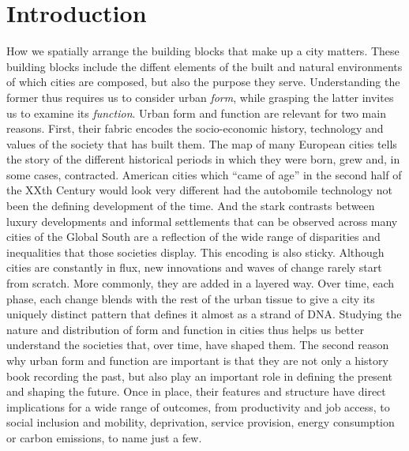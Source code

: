 \section{Introduction}
\label{sec:intro}

How we spatially arrange the building blocks that make up a city matters.
These building blocks include the diffent
elements of the built and natural environments of which cities are composed,
but also the purpose they serve.
Understanding the former thus requires us to consider urban \textit{form}, while
grasping the latter invites us to examine its \textit{function}.
Urban form and function are relevant for two main reasons. First, their fabric
encodes the socio-economic history, technology and values
of the society that has built them. 
%
The map of many European cities tells the story of the different historical
periods in which they were born, grew and, in some cases, contracted.
%
American cities which ``came of age'' in the second half of the XXth Century
would look very different had the autobomile technology not been the defining
development of the time.
%
And the stark contrasts between luxury developments and informal settlements
that can be observed across many cities of the Global South are a reflection
of the wide range of disparities and inequalities that those societies
display.
%
This encoding is also sticky. Although cities are constantly in flux, new
innovations and waves of change rarely start from scratch. More commonly, they
are added in a layered way. Over time, each phase, each change blends with the rest
of the urban tissue to give a city its uniquely distinct pattern that defines
it almost as a strand of DNA.
%
Studying the nature and distribution
of form and function in cities thus helps us better understand the societies
that, over time, have shaped them.
The second reason why urban form and function are important is that they are
not only a history book recording the past, but also play an important role in
defining the present and shaping the future.
%
Once in place, their features and structure have direct implications for a
wide range of outcomes, from  productivity and job access, to social inclusion
and mobility, deprivation, service provision, energy consumption or carbon
emissions, to name just a few.


